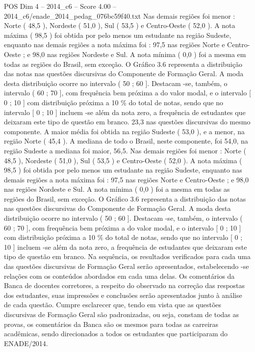 \begin{textsample}{POS Dim 4 – 2014\_c6 – Score 4.00 – 2014\_c6/enade\_2014\_pedag\_076bc59f40.txt}
Nas demais regiões foi menor : Norte ( 48,5 ), Nordeste ( 51,0 ), Sul ( 53,5 ) e Centro-Oeste ( 52,0 ).
A nota máxima ( 98,5 ) foi obtida por pelo menos um estudante na região Sudeste, enquanto nas demais regiões a nota máxima foi : 97,5 nas regiões Norte e Centro-Oeste ; e 98,0 nas regiões Nordeste e Sul.
A nota mínima ( 0,0 ) foi a mesma em todas as regiões do Brasil, sem exceção.
O Gráfico 3.6 representa a distribuição das notas nas questões discursivas do Componente de Formação Geral.
A moda desta distribuição ocorre no intervalo ( 50 ; 60 ].
Destacam -se, também, o intervalo ( 60 ; 70 ], com frequência bem próxima a do valor modal, e o intervalo [ 0 ; 10 ] com distribuição próxima a 10 \% do total de notas, sendo que no intervalo [ 0 ; 10 ] incluem -se além da nota zero, a frequência de estudantes que deixaram este tipo de questão em branco. 23,3 nas questões discursivas do mesmo componente.
A maior média foi obtida na região Sudeste ( 53,0 ), e a menor, na região Norte ( 45,4 ).
A mediana de todo o Brasil, neste componente, foi 54,0, na região Sudeste a mediana foi maior, 56,5.
Nas demais regiões foi menor : Norte ( 48,5 ), Nordeste ( 51,0 ), Sul ( 53,5 ) e Centro-Oeste ( 52,0 ).
A nota máxima ( 98,5 ) foi obtida por pelo menos um estudante na região Sudeste, enquanto nas demais regiões a nota máxima foi : 97,5 nas regiões Norte e Centro-Oeste ; e 98,0 nas regiões Nordeste e Sul.
A nota mínima ( 0,0 ) foi a mesma em todas as regiões do Brasil, sem exceção.
O Gráfico 3.6 representa a distribuição das notas nas questões discursivas do Componente de Formação Geral.
A moda desta distribuição ocorre no intervalo ( 50 ; 60 ].
Destacam -se, também, o intervalo ( 60 ; 70 ], com frequência bem próxima a do valor modal, e o intervalo [ 0 ; 10 ] com distribuição próxima a 10 \% do total de notas, sendo que no intervalo [ 0 ; 10 ] incluem -se além da nota zero, a frequência de estudantes que deixaram este tipo de questão em branco.
Na sequência, os resultados verificados para cada uma das questões discursivas de Formação Geral serão apresentados, estabelecendo -se relações com os conteúdos abordados em cada uma delas.
Os comentários da Banca de docentes corretores, a respeito do observado na correção das respostas dos estudantes, suas impressões e conclusões serão apresentados junto à análise de cada questão.
Cumpre esclarecer que, tendo em vista que as questões discursivas de Formação Geral são padronizadas, ou seja, constam de todas as provas, os comentários da Banca são os mesmos para todas as carreiras acadêmicas, sendo direcionados a todos os estudantes que participaram do ENADE/2014.

\end{textsample}
